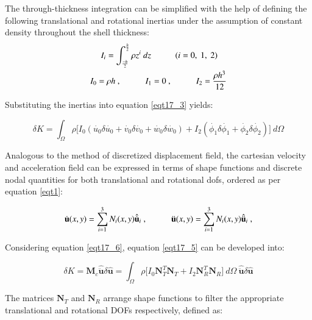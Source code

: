 The through-thickness integration can be simplified with the help of defining the following translational and rotational inertias under the assumption of constant density throughout the shell thickness:
\begin{gather} 
	\begin{aligned}
		&\ \ \ \ \ 
		I_i = \int_{\frac{-h}{2}}^{\frac{h}{2}} \rho 
		z^i
		\ dz
		\hspace{10mm}
		(i = 0,\ 1,\ 2)
		\\
		&I_0 = \rho h\ ,
		\hspace{10mm}
		I_1 = 0\ ,
		\hspace{10mm}
		I_2 = \frac{\rho h^3}{12}
		\label{eqt17_4}
	\end{aligned}
\end{gather}

Substituting the inertias into equation \ref{eqt17_3} yields:

\begin{equation} 
	\delta K = \int_{\Omega} 
	\rho
	\Big[I_0
	(\dot{u_0} \delta \dot{u_0} 
	+ \dot{v_0} \delta \dot{v_0}
	+ \dot{w_0} \delta \dot{w_0}
	)  
	+
	I_2
	(\dot{\phi_1} \delta \dot{\phi_1} 
	+ \dot{\phi_2} \delta \dot{\phi_2} 
	)  
	\Big]
	\ d\Omega
	\label{eqt17_5}
\end{equation}

Analogous to the method of discretized displacement field, the cartesian velocity and acceleration field can be expressed in terms of shape functions and discrete nodal quantities for both translational and rotational dofs, ordered as per equation \ref{eqt1}:

\begin{equation} 
\dot{\mathbf{u}} (x,y)
=
\sum_{i=1}^{3} N_i (x,y)
\hat{\dot{\mathbf{u}}}_i\ ,
\hspace{10mm}
\ddot{\mathbf{u}} (x,y)
=
\sum_{i=1}^{3} N_i (x,y)
\hat{\ddot{\mathbf{u}}}_i\ ,
\label{eqt17_6}
\end{equation}

Considering equation \ref{eqt17_6}, equation \ref{eqt17_5} can be developed into:

\begin{equation} 
\delta K = \mathbf{M}_c \hat{\ddot{\mathbf{{u}}}} \delta \hat{\mathbf{u}}
=
\int_{\Omega} 
\rho
\Big[I_0
\mathbf{N}_T^T
\mathbf{N}_T
+
I_2
\mathbf{N}_R^T
\mathbf{N}_R
\Big]
\ d\Omega\ 
\hat{\ddot{\mathbf{{u}}}}
\delta \hat{\mathbf{u}}
\label{eqt17_7}
\end{equation}

The matrices $\mathbf{N}_T$ and $\mathbf{N}_R$ arrange shape functions to filter the appropriate translational and rotational DOFs respectively, defined  as:


